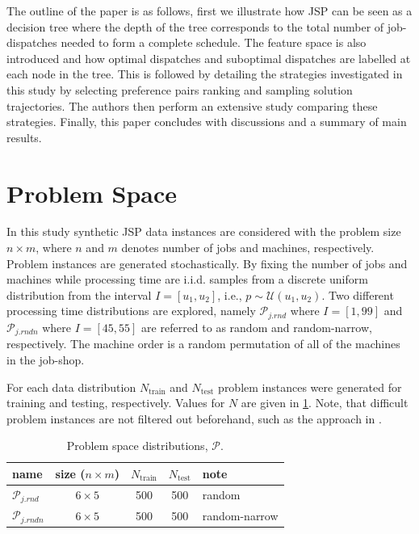 \documentclass[smallextended]{llncs}
\begin{document}
The outline of the paper is as follows, first we illustrate how JSP can be seen as a decision tree where the depth of the tree corresponds to the 
total number of job-dispatches needed to form a complete schedule. The feature space is also introduced and how  optimal dispatches and suboptimal dispatches are labelled at each node in the tree. This is followed by detailing the strategies investigated in this study by selecting preference pairs ranking and sampling solution trajectories. 
The authors then perform an extensive study comparing these strategies. Finally, this paper concludes with discussions and a summary of main results.

\section{Problem Space}
In this study synthetic JSP  data instances are considered with the problem size $n\times m$, where $n$ and $m$ denotes  number of jobs and machines, respectively. 
Problem instances are generated stochastically. By fixing the number of jobs and machines while processing time are i.i.d. samples from a discrete uniform distribution from the interval $I=[u_1,u_2]$, i.e., $p\sim \mathcal{U}(u_1,u_2)$.
Two different processing time distributions are explored, namely 
$\mathcal{P}_{j.rnd}$ where $I=[1,99]$ and $\mathcal{P}_{j.rndn}$ where $I=[45,55]$ are referred to as random and random-narrow, respectively.
The machine order is a random permutation of all of the machines in the job-shop. 

For each data distribution $N_{\text{train}}$  and $N_{\text{test}}$ problem instances were generated for training and testing, respectively. Values for $N$ are given in \cref{tbl:data:sim}. Note, that difficult problem instances are not filtered out beforehand, such as the approach in \cite{Whitley}. 

\begin{table}[t]\centering
\caption{Problem space distributions, $\mathcal{P}$. }\label{tbl:data:sim}
{\renewcommand{\arraystretch}{1.2}\footnotesize
\begin{tabular}{lcccl}\toprule
name&size ($n\times m$)& $N_{\text{train}}$&$N_{\text{test}}$  & note 
\\ \midrule
$\mathcal{P}_{j.rnd}$ & $6\times5$ & 500 & 500 & random \\
$\mathcal{P}_{j.rndn}$ & $6\times5$ & 500 & 500 & random-narrow \\
\bottomrule
\end{tabular}
}
\end{table}
\end{document}
